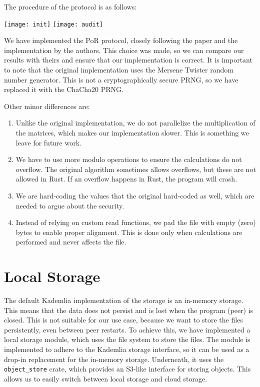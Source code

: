 The procedure of the protocol is as follows:

\begin{center}
\texttt{[image: init]}
\texttt{[image: audit]}
\end{center}

We have implemented the PoR protocol, closely following the paper and the implementation by the authors.
This choice was made, so we can compare our results with theirs and ensure that our implementation is correct.
It is important to note that the original implementation uses the Mersene Twister random number generator.
This is not a cryptographically secure PRNG, so we have replaced it with the ChaCha20 PRNG\cite{chacha}.


Other minor differences are:
\begin{enumerate}
    \item Unlike the original implementation, we do not parallelize the multiplication of the matrices,
        which makes our implementation slower.
        This is something we leave for future work.
    \item We have to use more modulo operations to ensure the calculations do not overflow.
        The original algorithm sometimes allows overflows, but these are not allowed in Rust.
        If an overflow happens in Rust, the program will crash.
    \item We are hard-coding the values that the original hard-coded as well, which are needed to argue about the security.
    \item Instead of relying on custom read functions, we pad the file with empty (zero) bytes to enable proper alignment.
        This is done only when calculations are performed and never affects the file.
\end{enumerate}

\section{Local Storage}

The default Kademlia implementation of the storage is an in-memory storage.
This means that the data does not persist and is lost when the program (peer) is closed.
This is not suitable for our use case, because we want to store the files persistently, even between peer restarts.
To achieve this, we have implemented a local storage module, which uses the file system to store the files.
The module is implemented to adhere to the Kademlia storage interface, so it can be used as a drop-in replacement for the in-memory storage.
Underneath, it uses the \texttt{object\_store} crate, which provides an S3-like interface for storing objects.
This allows us to easily switch between local storage and cloud storage.

